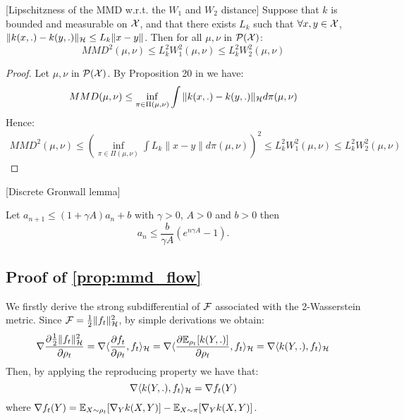 \begin{lemma}\label{lem:mmd_w2}[Lipschitzness of the MMD w.r.t. the $W_1$ and $W_2$ distance]
	 Suppose that $k$ is bounded and measurable on ${{\mathcal X}}$, and that there exists $L_k$ such that $\forall x,y \in {{\mathcal X}}$, $\| k(x,.)-k(y,.) \|_{{{\mathcal H}}}\le L_k \|x-y\|$. Then for all $\mu, \nu$ in $\mathcal{P}({{\mathcal X}})$:
	\begin{equation}
	MMD^2(\mu,\nu)\le  L_k^2 W_1^2(\mu,\nu) \le L_k^2 W_2^2(\mu,\nu)
	\end{equation}
\end{lemma}
\begin{proof}
Let $\mu, \nu$ in $\mathcal{P}({{\mathcal X}})$. By Proposition 20 in \cite{sriperumbudur2010hilbert} we have:
\begin{equation}
	MMD(\mu, \nu)	 \le \inf_{\pi \in \Pi(\mu, \nu)} \int \| k(x,.)-k(y,.) \|_{{{\mathcal H}}} d\pi(\mu, \nu)
\end{equation}
Hence:
\begin{align}
	MMD^2(\mu, \nu)	
	 \le (\inf_{\pi \in \Pi(\mu, \nu)} \int L_k \| x-y \| d\pi(\mu, \nu))^2
 \le L_k^2 W_1^2(\mu, \nu) \le L_k^2 W_2^2(\mu,\nu)
\end{align}
\end{proof}


\begin{lemma}
\label{lem:Discrete-Gronwall-lemma}[Discrete Gronwall lemma]

Let $a_{n+1}\leq(1+\gamma A)a_{n}+b$ with $\gamma>0$, $A>0$ and
$b>0$ then 
\[
a_{n}\leq\frac{b}{\gamma A}(e^{n\gamma A}-1).
\]
\end{lemma}



\subsection{Proof of \cref{prop:mmd_flow}}

We firstly derive the strong subdifferential of ${{\mathcal F}}$ associated with the 2-Wasserstein metric. Since ${{\mathcal F}}= \frac{1}{2} \|f_t\|^2_{{{\mathcal H}}}$, by simple derivations we obtain:
\begin{equation}
 \nabla \frac{\partial\frac{1}{2} \|f_t\|^2_{{{\mathcal H}}}}{\partial \rho_t}= \nabla \langle \frac{\partial f_t}{\partial \rho_t}, f_t \rangle_{{{\mathcal H}}}= \nabla \langle \frac{\partial {{\mathbb E}}_{\rho_t}[k(Y,.)]}{\partial \rho_t}, f_t \rangle_{{{\mathcal H}}}= \nabla \langle k(Y,.), f_t \rangle_{{{\mathcal H}}}
\end{equation}
Then, by applying the reproducing property we have that:
\begin{equation}
\nabla \langle k(Y,.), f_t \rangle_{{{\mathcal H}}}
= \nabla f_t(Y)
\end{equation}
where $\nabla f_t(Y)= {{\mathbb E}}_{X \sim \rho_t}[\nabla_{Y}k(X,Y)] -  {{\mathbb E}}_{X \sim \pi}[\nabla_{Y}k(X,Y)]$.


